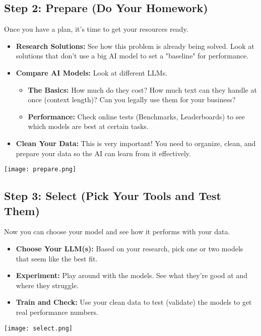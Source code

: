 \documentclass[a4paper, 12pt]{article}
\begin{document}
\newpage
\subsection*{Step 2: Prepare (Do Your Homework)}
Once you have a plan, it's time to get your resources ready.

\begin{itemize}
    \item \textbf{Research Solutions:} See how this problem is already being solved. Look at solutions that don't use a big AI model to set a "baseline" for performance.
    \item \textbf{Compare AI Models:} Look at different LLMs.
    \begin{itemize}
        \item \textbf{The Basics:} How much do they cost? How much text can they handle at once (context length)? Can you legally use them for your business?
        \item \textbf{Performance:} Check online tests (Benchmarks, Leaderboards) to see which models are best at certain tasks.
    \end{itemize}
    \item \textbf{Clean Your Data:} This is very important! You need to organize, clean, and prepare your data so the AI can learn from it effectively.
\end{itemize}
\begin{center}
\texttt{[image: prepare.png]}
\end{center}

\newpage
\subsection*{Step 3: Select (Pick Your Tools and Test Them)}
Now you can choose your model and see how it performs with your data.

\begin{itemize}
    \item \textbf{Choose Your LLM(s):} Based on your research, pick one or two models that seem like the best fit.
    \item \textbf{Experiment:} Play around with the models. See what they're good at and where they struggle.
    \item \textbf{Train and Check:} Use your clean data to test (validate) the models to get real performance numbers.
\end{itemize}
\begin{center}
\texttt{[image: select.png]}
\end{center}
\newpage
\end{document}
